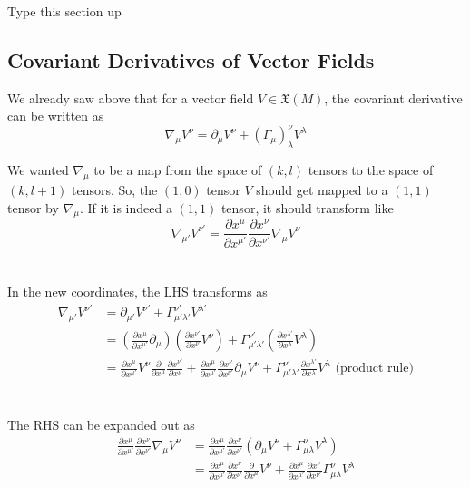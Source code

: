 \documentclass[11pt]{article}
\begin{document}
\begin{note}
  {Type this section up}
\end{note}

\subsection{Covariant Derivatives of Vector Fields}
We already saw above that for a vector field $V \in \mathfrak{X}(M)$, the covariant derivative can be written as 
\[  \nabla_{\mu} V^{\nu} = \partial_{\mu} V^{\nu} + (\Gamma_{\mu})_{\lambda}^{\nu} V^{\lambda} \]

We wanted $\nabla_{\mu}$ to be a map from the space of $(k,l)$ tensors to the space of $(k, l+1)$ tensors. So, the $(1, 0)$ tensor $V$ should get mapped to a $(1,1)$ tensor by $\nabla_{\mu}$. If it is indeed a $(1,1)$ tensor, it should transform like
\[ \nabla_{\mu'} V^{\nu'} = \frac{\partial x^{\mu}}{\partial x^{\mu'}} \frac{\partial x^{\nu}}{\partial x^{\nu'}} \nabla_{\mu} V^{\nu} \]
\\
\\
In the new coordinates, the LHS transforms as 
\begin{align*}
  \nabla_{\mu'} V^{\nu'} &= \partial_{\mu'} V^{\nu'} + \Gamma_{\mu' \lambda'}^{\nu'} V^{\lambda'} \\
  &= \left(\frac{\partial x^{\mu}}{\partial x^{\mu'}} \partial_{\mu}\right) \left( \frac{\partial x^{\nu'}}{\partial x^{\nu}} V^{\nu} \right) + \Gamma_{\mu' \lambda'}^{\nu'} \left(\frac{\partial x^{\lambda'}}{\partial x^{\lambda}} V^{\lambda} \right)\\
  &= \frac{\partial x^{\mu}}{\partial x^{\mu'}} V^{\nu} \frac{\partial}{\partial x^{\mu}} \frac{\partial x^{\nu'}}{\partial x^{\nu}}  +  \frac{\partial x^{\mu}}{\partial x^{\mu'}} \frac{\partial x^{\nu}}{\partial x^{\nu'}} \partial_{\mu} V^{\nu} +  \Gamma_{\mu' \lambda'}^{\nu'} \frac{\partial x^{\lambda'}}{\partial x^{\lambda}} V^{\lambda} \text{ (product rule)}
\end{align*}
\\
\\
The RHS can be expanded out as 
\begin{align*}
  \frac{\partial x^{\mu}}{\partial x^{\mu'}} \frac{\partial x^{\nu}}{\partial x^{\nu'}} \nabla_{\mu} V^{\nu} &= \frac{\partial x^{\mu}}{\partial x^{\mu'}} \frac{\partial x^{\nu}}{\partial x^{\nu'}} \left( \partial_{\mu} V^{\nu} + \Gamma_{\mu \lambda}^{\nu} V^{\lambda} \right) \\
  &= \frac{\partial x^{\mu}}{\partial x^{\mu'}} \frac{\partial x^{\nu}}{\partial x^{\nu'}} \frac{\partial}{\partial x^{\mu}} V^{\nu} + \frac{\partial x^{\mu}}{\partial x^{\mu'}} \frac{\partial x^{\nu}}{\partial x^{\nu'}} \Gamma_{\mu \lambda}^{\nu} V^{\lambda}
\end{align*}
\end{document}
